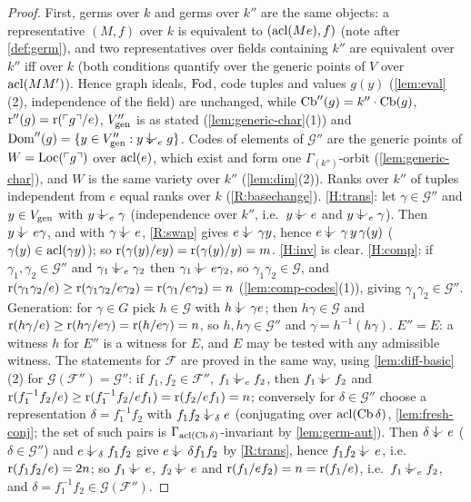 \begin{proof}
First, germs over $k$ and germs over $k''$ are the same objects: a representative
$(M,f)$ over $k$ is equivalent to $(\operatorname{acl}(Me),f)$ (note after \cref{def:germ}), and two
representatives over fields containing $k''$ are equivalent over $k''$ iff over $k$
(both conditions quantify over the generic points of $V$ over $\operatorname{acl}(MM')$).  Hence
graph ideals, $\operatorname{Fod}$, code tuples and values $g(y)$ (\cref{lem:eval}(2), independence
of the field) are unchanged, while $\operatorname{Cb}''(g)=k''\cdot\operatorname{Cb}(g)$, $\operatorname{r}''(g)=\operatorname{r}(\ulcorner g\urcorner/e)$,
$V''_{\operatorname{gen}}$ is as stated (\cref{lem:generic-char}(1)) and
$\operatorname{Dom}''(g)=\{y\in V''_{\Gen}:y\ind{e}g\}$.
Codes of elements of $\mathcal G''$ are the generic points of $W=\operatorname{Loc}(\ulcorner g\urcorner)$ over
$\operatorname{acl}(e)$, which exist and form one $\Gamma_{(k'')}$-orbit (\cref{lem:generic-char}), and
$W$ is the same variety over $k''$ (\cref{lem:dim}(2)).
Ranks over $k''$ of tuples independent from $e$ equal ranks over $k$
(\ref{R:basechange}).  \ref{H:trans}: let $\gamma\in\mathcal G''$ and $y\in V_{\operatorname{gen}}$ with
$y\ind{e}\gamma$ (independence over $k''$, i.e.\ $y\ind{}e$ and $y\ind{e}\gamma$).  Then
$y\ind{}e\gamma$, and with $\gamma\ind{}e$, \ref{R:swap} gives $e\ind{}\gamma y$, hence
$e\ind{}\gamma\,y\,\gamma(y)$ ($\gamma(y)\in\operatorname{acl}(\gamma y)$); so $\operatorname{r}(\gamma(y)/ey)=\operatorname{r}(\gamma(y)/y)=m$.
\ref{H:inv} is clear.  \ref{H:comp}: if $\gamma_1,\gamma_2\in\mathcal G''$ and
$\gamma_1\ind{e}\gamma_2$ then $\gamma_1\ind{}e\gamma_2$, so $\gamma_1\gamma_2\in\mathcal G$,
and $\operatorname{r}(\gamma_1\gamma_2/e)\ge\operatorname{r}(\gamma_1\gamma_2/e\gamma_2)=\operatorname{r}(\gamma_1/e\gamma_2)=n$
(\cref{lem:comp-codes}(1)), giving $\gamma_1\gamma_2\in\mathcal G''$.  Generation: for $\gamma\in G$ pick $h\in\mathcal G$ with
$h\ind{}\gamma e$; then $h\gamma\in\mathcal G$ and $\operatorname{r}(h\gamma/e)\ge\operatorname{r}(h\gamma/e\gamma)=\operatorname{r}(h/e\gamma)=n$,
so $h,h\gamma\in\mathcal G''$ and $\gamma=h^{-1}(h\gamma)$.  $E''=E$: a witness $h$ for $E''$ is a
witness for $E$, and $E$ may be tested with any admissible witness.  The statements for
$\mathcal F$ are proved in the same way, using \cref{lem:diff-basic}(2) for
$\mathcal G(\mathcal F'')=\mathcal G''$: if $f_1,f_2\in\mathcal F''$, $f_1\ind{e}f_2$, then
$f_1\ind{}f_2$ and $\operatorname{r}(f_1^{-1}f_2/e)\ge\operatorname{r}(f_1^{-1}f_2/ef_1)=\operatorname{r}(f_2/ef_1)=n$; conversely for
$\delta\in\mathcal G''$ choose a representation $\delta=f_1^{-1}f_2$ with $f_1f_2\ind{\delta}e$
(conjugating over $\operatorname{acl}(\operatorname{Cb}\delta)$, \cref{lem:fresh-conj}; the set of such pairs is
$\Gamma_{\operatorname{acl}(\operatorname{Cb}\delta)}$-invariant by \cref{lem:germ-aut}).  Then $\delta\ind{}e$
($\delta\in\mathcal G''$) and $e\ind{\delta}f_1f_2$ give $e\ind{}\delta f_1f_2$ by
\ref{R:trans}, hence $f_1f_2\ind{}e$, i.e.\ $\operatorname{r}(f_1f_2/e)=2n$; so $f_1\ind{}e$,
$f_2\ind{}e$ and $\operatorname{r}(f_1/ef_2)=n=\operatorname{r}(f_1/e)$, i.e.\ $f_1\ind{e}f_2$, and
$\delta=f_1^{-1}f_2\in\mathcal G(\mathcal F'')$.
\end{proof}

